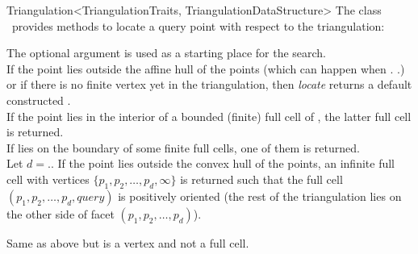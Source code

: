 \begin{ccRefClass}{Triangulation<TriangulationTraits, TriangulationDataStructure>}
The class \ccRefName\ provides methods to locate a query point with respect to
the triangulation:

{The optional argument  is used as a starting place for the search.\\
If the  point lies outside the affine hull of the points (which can
happen when \ccVar.
\ccVar.) or if there is no finite vertex yet in the
triangulation, then \textit{locate} returns a default constructed
.\\
If the point  lies in the interior of a bounded (finite) full cell of \ccVar,
the latter full cell is returned.\\
If  lies on the boundary of some finite full cells, one of them
is returned.\\
Let $d=$\ccVar.. If the point  lies
outside the convex hull of the points, an infinite full cell with vertices $\{
p_1, p_2, \ldots, p_d, \infty\}$ is returned such that the full cell $(p_1, p_2,
\ldots, p_d, query)$ is positively oriented (the rest of the triangulation lies
on the other side of facet $(p_1, p_2, \ldots, p_d)$).}

{Same as above but  is a vertex and not a full cell.}


\end{ccRefClass}
